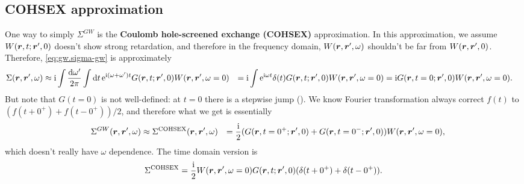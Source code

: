 \documentclass[hyperref, a4paper]{report}
\newcommand*{\ii}{\mathrm{i}}
\newcommand*{\ee}{\mathrm{e}}
\newcommand*{\concept}[1]{{\textbf{#1}}}
\def\\{}%
\begin{document}
\subsection{COHSEX approximation}

One way to simply $\Sigma^{GW}$ is the 
\concept{Coulomb hole-screened exchange (COHSEX)} approximation.
In this approximation, 
we assume $W(\vb*{r}, t; \vb*{r}', 0)$ doesn't show strong retardation,
and therefore in the frequency domain, 
$W(\vb*{r}, \vb*{r}', \omega)$ shouldn't be far from $W(\vb*{r}, \vb*{r}', 0)$.
Therefore, \eqref{eq:gw.sigma-gw} is approximately 
\[
    \begin{aligned}
        \Sigma(\vb*{r}, \vb*{r}', \omega) &\approx \ii 
        \int \frac{\dd{\omega'}}{2\pi} \int \dd{t} \ee^{\ii (\omega + \omega') t} 
        G(\vb*{r}, t; \vb*{r}', 0) W(\vb*{r}, \vb*{r}', \omega = 0) \\
        &= \ii \int \ee^{\ii \omega t} \delta(t) G(\vb*{r}, t; \vb*{r}', 0) W(\vb*{r}, \vb*{r}', \omega = 0) \\
        &= \ii G(\vb*{r}, t = 0; \vb*{r}', 0) W(\vb*{r}, \vb*{r}', \omega = 0).
    \end{aligned}
\]
But note that $G(t = 0)$ is not well-defined: 
at $t = 0$ there is a stepwise jump ().
We know Fourier transformation 
always correct $f(t)$ to $(f(t + 0^+) + f(t - 0^+)) / 2$,
and therefore what we get is essentially 
\begin{equation}
    \begin{aligned}
        &\quad \Sigma^{GW}(\vb*{r}, \vb*{r}', \omega) \approx
        \Sigma^{\text{COHSEX}} (\vb*{r}, \vb*{r}', \omega) \\
        &= \frac{\ii}{2} (
            G(\vb*{r}, t = 0^+; \vb*{r}', 0) + 
            G(\vb*{r}, t = 0^-; \vb*{r}', 0)
        ) W(\vb*{r}, \vb*{r}', \omega = 0),
    \end{aligned}
\end{equation}
which doesn't really have $\omega$ dependence.
The time domain version is 
\begin{equation}
    \Sigma^{\text{COHSEX}} = \frac{\ii}{2}
    W(\vb*{r}, \vb*{r}', \omega = 0)
    G(\vb*{r}, t; \vb*{r}', 0)
    (\delta(t + 0^+) + \delta(t - 0^+)).
\end{equation}
\end{document}
